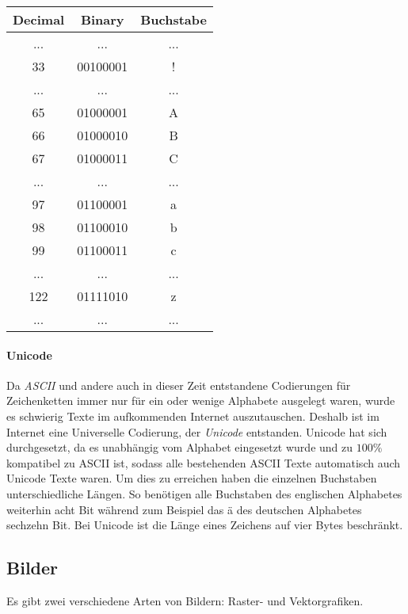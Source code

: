 \documentclass[../main.tex]{subfiles}
\begin{document}
                \begin{center}
                \begin{tabular}{ccc}
                    Decimal & Binary & Buchstabe \\\hline
                    ... & ... & ... \\
                    33 & 00100001 & ! \\
                    ... & ... & ... \\
                    65 & 01000001 & A \\
                    66 & 01000010 & B \\
                    67 & 01000011 & C \\
                    ... & ... & ... \\
                    97 & 01100001 & a \\
                    98 & 01100010 & b \\
                    99 & 01100011 & c \\
                    ... & ... & ... \\
                    122 & 01111010 & z \\
                    ... & ... & ... \\
                \end{tabular}
                \end{center}
            
            \paragraph{Unicode}
                Da \emph{ASCII} und andere auch in dieser Zeit entstandene Codierungen für Zeichenketten immer nur für ein oder wenige Alphabete ausgelegt waren, wurde es schwierig Texte im aufkommenden Internet auszutauschen. Deshalb ist im Internet eine Universelle Codierung, der \emph{Unicode} entstanden. Unicode hat sich durchgesetzt, da es unabhängig vom Alphabet eingesetzt wurde und zu $100\%$  kompatibel zu ASCII ist, sodass alle bestehenden ASCII Texte automatisch auch Unicode Texte waren. Um dies zu erreichen haben die einzelnen Buchstaben unterschiedliche Längen. So benötigen alle Buchstaben des englischen Alphabetes weiterhin acht Bit während zum Beispiel das ä des deutschen Alphabetes sechzehn Bit. Bei Unicode ist die Länge eines Zeichens auf vier Bytes beschränkt.
            
        \subsection{Bilder}
            Es gibt zwei verschiedene Arten von Bildern: Raster- und Vektorgrafiken.
            
\end{document}
